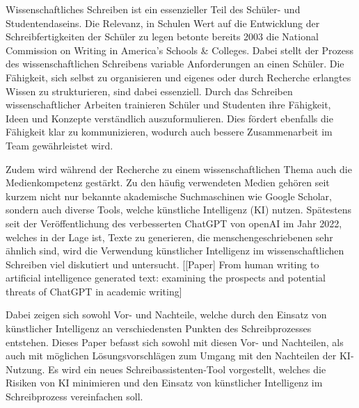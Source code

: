 \documentclass[../main.tex]{subfiles}
\begin{document}
Wissenschaftliches Schreiben ist ein essenzieller Teil des Schüler- und Studentendaseins. 
Die Relevanz, in Schulen Wert auf die Entwicklung der Schreibfertigkeiten der Schüler zu legen betonte bereits 2003 
die National Commission on Writing in America’s Schools \& Colleges. Dabei stellt der Prozess des 
wissenschaftlichen Schreibens variable Anforderungen an einen Schüler. Die Fähigkeit, sich selbst zu organisieren und 
eigenes oder durch Recherche erlangtes Wissen zu strukturieren, sind dabei essenziell. Durch das Schreiben 
wissenschaftlicher Arbeiten trainieren Schüler und Studenten ihre Fähigkeit, Ideen und Konzepte verständlich 
auszuformulieren. Dies fördert ebenfalls die Fähigkeit klar zu kommunizieren, wodurch auch bessere Zusammenarbeit 
im Team gewährleistet wird.  

Zudem wird während der Recherche zu einem wissenschaftlichen Thema auch die Medienkompetenz gestärkt. Zu den häufig 
verwendeten Medien gehören seit kurzem nicht nur bekannte akademische Suchmaschinen wie Google Scholar, sondern auch 
diverse Tools, welche künstliche Intelligenz (KI) nutzen. Spätestens seit der Veröffentlichung des verbesserten ChatGPT von openAI im Jahr 2022, welches in der 
Lage ist, Texte zu generieren, die menschengeschriebenen sehr ähnlich sind, wird die Verwendung künstlicher Intelligenz 
im wissenschaftlichen Schreiben viel diskutiert und untersucht. [[Paper] From human writing to artificial intelligence generated text: examining the prospects and potential threats of ChatGPT in academic writing]

Dabei zeigen sich sowohl Vor- und Nachteile, welche durch den Einsatz von künstlicher Intelligenz an 
verschiedensten Punkten des Schreibprozesses entstehen. 
Dieses Paper befasst sich sowohl mit diesen Vor- und Nachteilen, als auch mit möglichen
Lösungsvorschlägen zum Umgang mit den Nachteilen der KI-Nutzung. Es wird ein neues Schreibassistenten-Tool vorgestellt, welches die Risiken 
von KI minimieren und den Einsatz von künstlicher Intelligenz im Schreibprozess vereinfachen soll.
\end{document}
